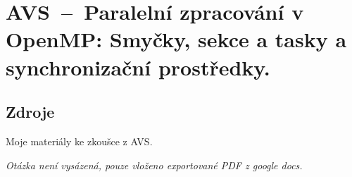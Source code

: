 

\graphicspath{{avs/paralelni_zpracovani_v_openmp/figures}}


\chapter{AVS~--~Paralelní zpracování v OpenMP: Smyčky, sekce a tasky a synchronizační prostředky.}


\section{Zdroje}

\begin{compactitem}
    \item Moje materiály ke zkoušce z AVS.
    \item {}
    \item {}
    \item {}
    \item \textit{Otázka není vysázená, pouze vloženo exportované PDF z google docs.}
\end{compactitem}








